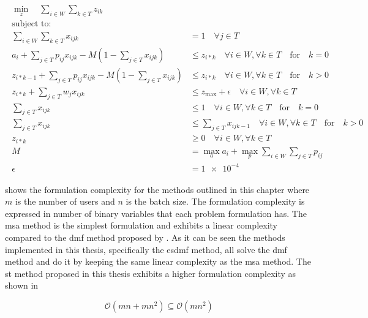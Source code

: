 \begin{align}
	\begin{split}
	    \min_z \quad \sum_{i \in W} \sum_{k \in T} z_{ik}\\
	    \text{subject to:} \\
	    \sum_{i \in W} \sum_{k \in T} x_{ijk} &= 1 \quad \forall j \in T\\
	    a_i + \sum_{j \in T} p_{ij} x_{ijk} - M(1 - \sum_{j \in T} x_{ijk}) &\leq z_{i*k} \quad \forall i \in W, \forall k \in T \quad \text{for} \quad k=0\\
	    z_{i*k-1} + \sum_{j \in T} p_{ij} x_{ijk} - M(1 - \sum_{j \in T} x_{ijk}) &\leq z_{i*k} \quad \forall i \in W, \forall k \in T \quad \text{for} \quad k>0\\
	    z_{i*k}+ \sum_{j \in T} w_j x_{ijk} &\leq z_{\text{max}} + \epsilon \quad \forall i \in W, \forall k \in T\\
	    \sum_{j \in T} x_{ijk} &\leq 1 \quad \forall i \in W, \forall k \in T \quad \text{for} \quad k=0\\
	    \sum_{j \in T} x_{ijk} &\leq \sum_{j \in T} x_{ijk-1} \quad \forall i \in W, \forall k \in T \quad \text{for} \quad k>0\\
	    z_{i*k} &\geq 0 \quad \forall i \in W, \forall k \in T\\
	    M &= \max_a a_i + \max_p \sum_{i \in W} \sum_{j \in T} p_{ij}\\
	    \epsilon &= \num{1e-4}
	\end{split}
\end{align}

 shows the formulation complexity for the methods outlined in this chapter where $m$ is the number of users and $n$ is the batch size. The formulation complexity is expressed in number of binary variables that each problem formulation has. The \gls{msa} method is the simplest formulation and exhibits a linear complexity compared to the \gls{dmf} method proposed by \citet{Zeng2005}. As it can be seen the methods implemented in this thesis, specifically the \gls{esdmf} method, all solve the \gls{dmf} method and do it by keeping the same linear complexity as the \gls{msa} method. The \gls{st} method proposed in this thesis exhibits a higher formulation complexity as shown in 

\begin{equation}
\label{eq:st_complexity}
	\mathcal{O}(mn+mn^2) \subseteq \mathcal{O}(mn^2)
\end{equation}
 

